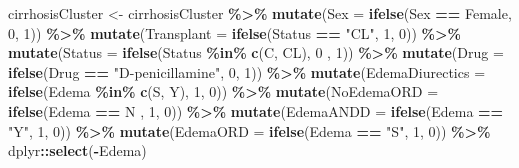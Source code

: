 \documentclass[
]{article}
\newenvironment{Shaded}{\begin{snugshade}}{\end{snugshade}}
\newcommand{\AttributeTok}[1]{\textcolor[rgb]{0.13,0.29,0.53}{#1}}
\newcommand{\DecValTok}[1]{\textcolor[rgb]{0.00,0.00,0.81}{#1}}
\newcommand{\FunctionTok}[1]{\textcolor[rgb]{0.13,0.29,0.53}{\textbf{#1}}}
\newcommand{\NormalTok}[1]{#1}
\newcommand{\OtherTok}[1]{\textcolor[rgb]{0.56,0.35,0.01}{#1}}
\newcommand{\SpecialCharTok}[1]{\textcolor[rgb]{0.81,0.36,0.00}{\textbf{#1}}}
\newcommand{\StringTok}[1]{\textcolor[rgb]{0.31,0.60,0.02}{#1}}
\begin{document}
\begin{Shaded}
\begin{Highlighting}[]
      
\NormalTok{  cirrhosisCluster  }\OtherTok{\textless{}{-}}\NormalTok{ cirrhosisCluster }\SpecialCharTok{\%\textgreater{}\%}
    \FunctionTok{mutate}\NormalTok{(}\AttributeTok{Sex =} \FunctionTok{ifelse}\NormalTok{(Sex }\SpecialCharTok{==} \StringTok{\textquotesingle{}Female\textquotesingle{}}\NormalTok{, }\DecValTok{0}\NormalTok{, }\DecValTok{1}\NormalTok{)) }\SpecialCharTok{\%\textgreater{}\%}
          \FunctionTok{mutate}\NormalTok{(}\AttributeTok{Transplant =} \FunctionTok{ifelse}\NormalTok{(Status }\SpecialCharTok{==} \StringTok{"CL"}\NormalTok{, }\DecValTok{1}\NormalTok{, }\DecValTok{0}\NormalTok{)) }\SpecialCharTok{\%\textgreater{}\%}
              \FunctionTok{mutate}\NormalTok{(}\AttributeTok{Status =} \FunctionTok{ifelse}\NormalTok{(Status }\SpecialCharTok{\%in\%} \FunctionTok{c}\NormalTok{(}\StringTok{\textquotesingle{}C\textquotesingle{}}\NormalTok{, }\StringTok{\textquotesingle{}CL\textquotesingle{}}\NormalTok{), }\DecValTok{0}\NormalTok{ , }\DecValTok{1}\NormalTok{)) }\SpecialCharTok{\%\textgreater{}\%}
                    \FunctionTok{mutate}\NormalTok{(}\AttributeTok{Drug =} \FunctionTok{ifelse}\NormalTok{(Drug }\SpecialCharTok{==} \StringTok{"D{-}penicillamine"}\NormalTok{, }\DecValTok{0}\NormalTok{, }\DecValTok{1}\NormalTok{)) }\SpecialCharTok{\%\textgreater{}\%}
                        \FunctionTok{mutate}\NormalTok{(}\AttributeTok{EdemaDiurectics =} \FunctionTok{ifelse}\NormalTok{(Edema }\SpecialCharTok{\%in\%} \FunctionTok{c}\NormalTok{(}\StringTok{\textquotesingle{}S\textquotesingle{}}\NormalTok{, }\StringTok{\textquotesingle{}Y\textquotesingle{}}\NormalTok{), }\DecValTok{1}\NormalTok{, }\DecValTok{0}\NormalTok{)) }\SpecialCharTok{\%\textgreater{}\%}
                              \FunctionTok{mutate}\NormalTok{(}\AttributeTok{NoEdemaORD =} \FunctionTok{ifelse}\NormalTok{(Edema }\SpecialCharTok{==} \StringTok{\textquotesingle{}N\textquotesingle{}}\NormalTok{ , }\DecValTok{1}\NormalTok{, }\DecValTok{0}\NormalTok{)) }\SpecialCharTok{\%\textgreater{}\%}
                                        \FunctionTok{mutate}\NormalTok{(}\AttributeTok{EdemaANDD =} \FunctionTok{ifelse}\NormalTok{(Edema }\SpecialCharTok{==} \StringTok{"Y"}\NormalTok{, }\DecValTok{1}\NormalTok{, }\DecValTok{0}\NormalTok{)) }\SpecialCharTok{\%\textgreater{}\%}
                                                \FunctionTok{mutate}\NormalTok{(}\AttributeTok{EdemaORD =} \FunctionTok{ifelse}\NormalTok{(Edema }\SpecialCharTok{==} \StringTok{"S"}\NormalTok{, }\DecValTok{1}\NormalTok{, }\DecValTok{0}\NormalTok{)) }\SpecialCharTok{\%\textgreater{}\%}
\NormalTok{                                                                              dplyr}\SpecialCharTok{::}\FunctionTok{select}\NormalTok{(}\SpecialCharTok{{-}}\NormalTok{Edema)}
                                        

\end{Highlighting}
\end{Shaded}
\end{document}
